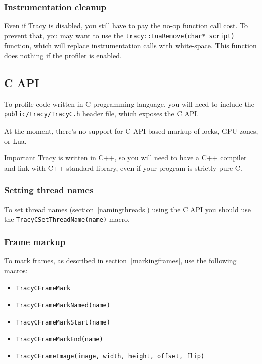 \documentclass[hidelinks,titlepage,a4paper,twoside]{article}
\begin{document}
\subsubsection{Instrumentation cleanup}

Even if Tracy is disabled, you still have to pay the no-op function call cost. To prevent that, you may want to use the \texttt{tracy::LuaRemove(char* script)} function, which will replace instrumentation calls with white-space. This function does nothing if the profiler is enabled.

\subsection{C API}
\label{capi}

To profile code written in C programming language, you will need to include the \texttt{public/tracy/TracyC.h} header file, which exposes the C API.

At the moment, there's no support for C API based markup of locks, GPU zones, or Lua.

\begin{bclogo}[
noborder=true,
couleur=black!5,
logo=\bcbombe
]{Important}
Tracy is written in C++, so you will need to have a C++ compiler and link with C++ standard library, even if your program is strictly pure C.
\end{bclogo}

\subsubsection{Setting thread names}

To set thread names (section~\ref{namingthreads}) using the C API you should use the \texttt{TracyCSetThreadName(name)} macro.

\subsubsection{Frame markup}

To mark frames, as described in section~\ref{markingframes}, use the following macros:

\begin{itemize}
\item \texttt{TracyCFrameMark}
\item \texttt{TracyCFrameMarkNamed(name)}
\item \texttt{TracyCFrameMarkStart(name)}
\item \texttt{TracyCFrameMarkEnd(name)}
\item \texttt{TracyCFrameImage(image, width, height, offset, flip)}
\end{itemize}
\end{document}
